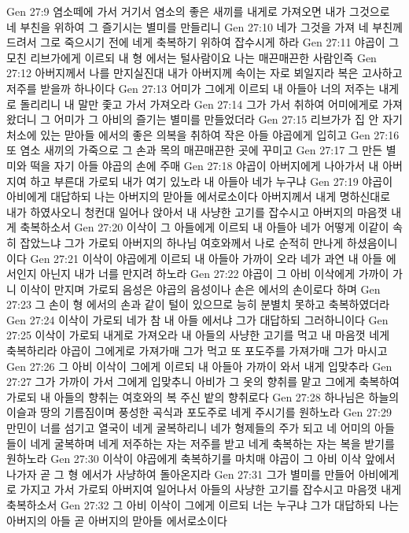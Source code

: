Gen 27:9  염소떼에 가서 거기서 염소의 좋은 새끼를 내게로 가져오면 내가 그것으로 네 부친을 위하여 그 즐기시는 별미를 만들리니
Gen 27:10  네가 그것을 가져 네 부친께 드려서 그로 죽으시기 전에 네게 축복하기 위하여 잡수시게 하라
Gen 27:11  야곱이 그 모친 리브가에게 이르되 내 형 에서는 털사람이요 나는 매끈매끈한 사람인즉
Gen 27:12  아버지께서 나를 만지실진대 내가 아버지께 속이는 자로 뵈일지라 복은 고사하고 저주를 받을까 하나이다
Gen 27:13  어미가 그에게 이르되 내 아들아 너의 저주는 내게로 돌리리니 내 말만 좇고 가서 가져오라
Gen 27:14  그가 가서 취하여 어미에게로 가져왔더니 그 어미가 그 아비의 즐기는 별미를 만들었더라
Gen 27:15  리브가가 집 안 자기 처소에 있는 맏아들 에서의 좋은 의복을 취하여 작은 아들 야곱에게 입히고
Gen 27:16  또 염소 새끼의 가죽으로 그 손과 목의 매끈매끈한 곳에 꾸미고
Gen 27:17  그 만든 별미와 떡을 자기 아들 야곱의 손에 주매
Gen 27:18  야곱이 아버지에게 나아가서 내 아버지여 하고 부른대 가로되 내가 여기 있노라 내 아들아 네가 누구냐
Gen 27:19  야곱이 아비에게 대답하되 나는 아버지의 맏아들 에서로소이다 아버지께서 내게 명하신대로 내가 하였사오니 청컨대 일어나 앉아서 내 사냥한 고기를 잡수시고 아버지의 마음껏 내게 축복하소서
Gen 27:20  이삭이 그 아들에게 이르되 내 아들아 네가 어떻게 이같이 속히 잡았느냐 그가 가로되 아버지의 하나님 여호와께서 나로 순적히 만나게 하셨음이니이다
Gen 27:21  이삭이 야곱에게 이르되 내 아들아 가까이 오라 네가 과연 내 아들 에서인지 아닌지 내가 너를 만지려 하노라
Gen 27:22  야곱이 그 아비 이삭에게 가까이 가니 이삭이 만지며 가로되 음성은 야곱의 음성이나 손은 에서의 손이로다 하며
Gen 27:23  그 손이 형 에서의 손과 같이 털이 있으므로 능히 분별치 못하고 축복하였더라
Gen 27:24  이삭이 가로되 네가 참 내 아들 에서냐 그가 대답하되 그러하니이다
Gen 27:25  이삭이 가로되 내게로 가져오라 내 아들의 사냥한 고기를 먹고 내 마음껏 네게 축복하리라 야곱이 그에게로 가져가매 그가 먹고 또 포도주를 가져가매 그가 마시고
Gen 27:26  그 아비 이삭이 그에게 이르되 내 아들아 가까이 와서 내게 입맞추라
Gen 27:27  그가 가까이 가서 그에게 입맞추니 아비가 그 옷의 향취를 맡고 그에게 축복하여 가로되 내 아들의 향취는 여호와의 복 주신 밭의 향취로다
Gen 27:28  하나님은 하늘의 이슬과 땅의 기름짐이며 풍성한 곡식과 포도주로 네게 주시기를 원하노라
Gen 27:29  만민이 너를 섬기고 열국이 네게 굴복하리니 네가 형제들의 주가 되고 네 어미의 아들들이 네게 굴복하며 네게 저주하는 자는 저주를 받고 네게 축복하는 자는 복을 받기를 원하노라
Gen 27:30  이삭이 야곱에게 축복하기를 마치매 야곱이 그 아비 이삭 앞에서 나가자 곧 그 형 에서가 사냥하여 돌아온지라
Gen 27:31  그가 별미를 만들어 아비에게로 가지고 가서 가로되 아버지여 일어나서 아들의 사냥한 고기를 잡수시고 마음껏 내게 축복하소서
Gen 27:32  그 아비 이삭이 그에게 이르되 너는 누구냐 그가 대답하되 나는 아버지의 아들 곧 아버지의 맏아들 에서로소이다
